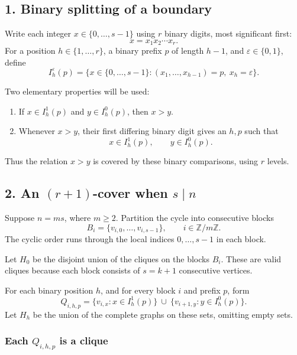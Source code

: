 \documentclass[
  11pt,
  a4paper,
]{article}
\providecommand{\tightlist}{%
  \setlength{\itemsep}{0pt}\setlength{\parskip}{0pt}}
\begin{document}
\subsection{1. Binary splitting of a
boundary}\label{binary-splitting-of-a-boundary}

Write each integer \(x\in\{0,\dots,s-1\}\) using \(r\) binary digits,
most significant first: \[
x=x_1x_2\cdots x_r.
\] For a position \(h\in\{1,\dots,r\}\), a binary prefix \(p\) of length
\(h-1\), and \(\varepsilon\in\{0,1\}\), define \[
I_h^\varepsilon(p)
=
\{x\in\{0,\dots,s-1\}:
(x_1,\dots,x_{h-1})=p,\ x_h=\varepsilon\}.
\]

Two elementary properties will be used:

\begin{enumerate}
\def\labelenumi{\arabic{enumi}.}
\tightlist
\item
  If \(x\in I_h^1(p)\) and \(y\in I_h^0(p)\), then \(x>y\).
\item
  Whenever \(x>y\), their first differing binary digit gives an \(h,p\)
  such that \[
  x\in I_h^1(p),\qquad y\in I_h^0(p).
  \]
\end{enumerate}

Thus the relation \(x>y\) is covered by these binary comparisons, using
\(r\) levels.

\subsection{\texorpdfstring{2. An \((r+1)\)-cover when
\(s\mid n\)}{2. An (r+1)-cover when s\textbackslash mid n}}\label{an-r1-cover-when-smid-n}

Suppose \(n=ms\), where \(m\ge2\). Partition the cycle into consecutive
blocks \[
B_i=\{v_{i,0},\dots,v_{i,s-1}\},
\qquad i\in\mathbb Z/m\mathbb Z.
\] The cyclic order runs through the local indices \(0,\dots,s-1\) in
each block.

Let \(H_0\) be the disjoint union of the cliques on the blocks \(B_i\).
These are valid cliques because each block consists of \(s=k+1\)
consecutive vertices.

For each binary position \(h\), and for every block \(i\) and prefix
\(p\), form \[
Q_{i,h,p}
=
\{v_{i,x}:x\in I_h^1(p)\}
\ \cup\
\{v_{i+1,y}:y\in I_h^0(p)\}.
\] Let \(H_h\) be the union of the complete graphs on these sets,
omitting empty sets.

\subsubsection{\texorpdfstring{Each \(Q_{i,h,p}\) is a
clique}{Each Q\_\{i,h,p\} is a clique}}\label{each-q_ihp-is-a-clique}
\end{document}
